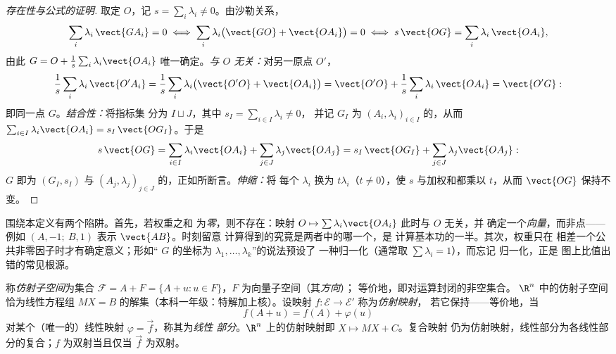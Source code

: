 \begin{proof}[存在性与公式的证明]
取定 $O$，记 $s = \sum_i\lambda_i \neq 0$。由沙勒关系，
\[
\sum_i\lambda_i\,\vect{GA_i} = 0
\iff \sum_i\lambda_i\bigl(\vect{GO} + \vect{OA_i}\bigr) = 0
\iff s\,\vect{OG} = \sum_i\lambda_i\,\vect{OA_i},
\]
由此 $G = O + \frac1s\sum_i\lambda_i\vect{OA_i}$
唯一确定。\emph{与 $O$ 无关：}对另一原点
$O'$，
\[
\frac1s\sum_i\lambda_i\,\vect{O'A_i}
= \frac1s\sum_i\lambda_i\bigl(\vect{O'O} + \vect{OA_i}\bigr)
= \vect{O'O} + \frac1s\sum_i\lambda_i\,\vect{OA_i}
= \vect{O'G} :
\]
即同一点 $G$。\emph{结合性：}将指标集
分为 $I \sqcup J$，其中 $s_I = \sum_{i\in I}\lambda_i \neq 0$，
并记 $G_I$ 为 $(A_i, \lambda_i)_{i\in
I}$ 的，从而 $\sum_{i\in I}\lambda_i\vect{OA_i} =
s_I\,\vect{OG_I}$。于是
\[
s\,\vect{OG}
= \sum_{i\in I}\lambda_i\vect{OA_i} +
\sum_{j\in J}\lambda_j\vect{OA_j}
= s_I\,\vect{OG_I} + \sum_{j\in J}\lambda_j\vect{OA_j} :
\]
$G$ 即为 $(G_I, s_I)$ 与 $(A_j,
\lambda_j)_{j\in J}$ 的，正如所断言。\emph{伸缩：}将
每个 $\lambda_i$ 换为 $t\lambda_i$（$t \neq 0$），使 $s$
与加权和都乘以 $t$，从而 $\vect{OG}$ 保持不变。
\end{proof}

\begin{remark}[常见误区]
围绕本定义有两个陷阱。首先，若权重之和
为\emph{零}，则不存在：映射 $O \mapsto
\sum\lambda_i\vect{OA_i}$ 此时与 $O$ 无关，并
确定一个\emph{向量}，而非点——例如
$(A, -1;\ B, 1)$ 表示 $\vect{AB}$。时刻留意
计算得到的究竟是两者中的哪一个，是
计算基本功的一半。其次，权重只在
相差一个公共非零因子时才有确定意义；形如“
$G$ 的坐标为 $\lambda_1, \dots, \lambda_k$”的说法预设了
一种归一化（通常取 $\sum\lambda_i = 1$），而忘记
归一化，正是
图上比值出错的常见根源。
\end{remark}

\begin{definition}\label{def:b2:affine:subspace}
称\emph{仿射子空间}为集合 $\mathcal{F} = A + F = \{A + u :
u \in F\}$，$F$ 为向量子空间（其\emph{方向}）；
等价地，即对运算封闭的非空集合。
$\R^n$ 中的仿射子空间恰为线性方程组
$MX = B$ 的解集（本科一年级：特解加上核）。设映射 $f \colon
\mathcal{E} \to \mathcal{E}'$ 称为\emph{仿射映射}，
若它保持——等价地，当
\[
f(A + u) = f(A) + \varphi(u)
\]
对某个（唯一的）线性映射 $\varphi = \vec f$，称其为\emph{线性
部分}。$\R^n$ 上的仿射映射即 $X \mapsto MX + C$。复合映射
仍为仿射映射，线性部分为各线性部分的复合；$f$ 为双射当且仅当 $\vec f$
为双射。
\end{definition}

